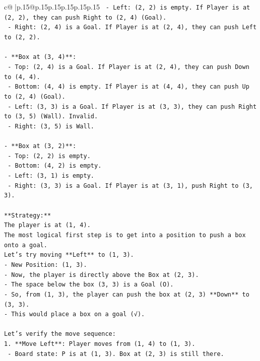 \documentclass{article}
\begin{document}
{\begin{supertabular}{c@{$\;$}|p{.15\linewidth}@{}p{.15\linewidth}p{.15\linewidth}p{.15\linewidth}p{.15\linewidth}p{.15\linewidth}}
{{{\texttt{  {-} Left: (2, 2) is empty. If Player is at (2, 2), they can push Right to (2, 4) (Goal).} \\
\texttt{  {-} Right: (2, 4) is a Goal. If Player is at (2, 4), they can push Left to (2, 2).} \\
\\ 
\texttt{{-} **Box at (3, 4)**:} \\
\texttt{  {-} Top: (2, 4) is a Goal. If Player is at (2, 4), they can push Down to (4, 4).} \\
\texttt{  {-} Bottom: (4, 4) is empty. If Player is at (4, 4), they can push Up to (2, 4) (Goal).} \\
\texttt{  {-} Left: (3, 3) is a Goal. If Player is at (3, 3), they can push Right to (3, 5) (Wall). Invalid.} \\
\texttt{  {-} Right: (3, 5) is Wall.} \\
\\ 
\texttt{{-} **Box at (3, 2)**:} \\
\texttt{  {-} Top: (2, 2) is empty.} \\
\texttt{  {-} Bottom: (4, 2) is empty.} \\
\texttt{  {-} Left: (3, 1) is empty.} \\
\texttt{  {-} Right: (3, 3) is a Goal. If Player is at (3, 1), push Right to (3, 3).} \\
\\ 
\texttt{**Strategy:**} \\
\texttt{The player is at (1, 4).} \\
\texttt{The most logical first step is to get into a position to push a box onto a goal.} \\
\texttt{Let's try moving **Left** to (1, 3).} \\
\texttt{{-} New Position: (1, 3).} \\
\texttt{{-} Now, the player is directly above the Box at (2, 3).} \\
\texttt{{-} The space below the box (3, 3) is a Goal (O).} \\
\texttt{{-} So, from (1, 3), the player can push the box at (2, 3) **Down** to (3, 3).} \\
\texttt{{-} This would place a box on a goal (√).} \\
\\ 
\texttt{Let's verify the move sequence:} \\
\texttt{1. **Move Left**: Player moves from (1, 4) to (1, 3).} \\
\texttt{   {-} Board state: P is at (1, 3). Box at (2, 3) is still there.} \\
}}}
\end{supertabular}}
\end{document}
